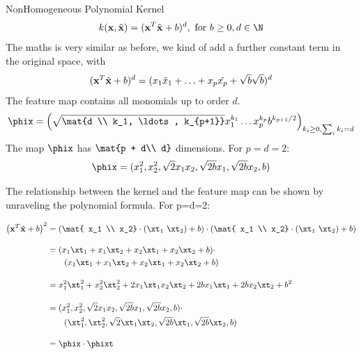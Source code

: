 \documentclass[11pt,compress,t,notes=noshow, xcolor=table]{beamer}
\begin{document}
\begin{vbframe}{NonHomogeneous Polynomial Kernel}
 $$k(\xv, \xtil) = (\xv^T \xtil + b)^d, \text{ for } b\geq 0, d \in \N$$
The maths is very similar as before, we kind of add a further constant term in the original space, with
$$ (\mathbf{x}^T \tilde{\mathbf{x}} + b)^d = (x_1 \tilde{x}_1 + \ldots + x_p \tilde{x_p} + \sqrt{b} \sqrt{b})^d$$
The feature map contains all monomials up to order $d$.
  $$\phix = \left( \sqrt{\mat{d \\ k_1, \ldots, k_{p+1}}} x_1^{k_1} \ldots x_p^{k_p} b^{k_{p+1}/2} \right)_{k_i \geq 0, \sum_i k_i = d}$$
The map $\phix$ has $\mat{p + d\\ d}$ dimensions. For $p=d=2$: 
$$\phix = (x_1^2, x_2^2, \sqrt{2} x_1 x_2, \sqrt{2b} x_1, \sqrt{2b} x_2, b)$$

\framebreak
  The relationship between the kernel and the feature map can be shown by unraveling the polynomial formula. For p=d=2:
  
  \begin{equation*}
    \begin{aligned}
        \left ( \xv^T \xtil + b  \right)^2 &=       \left ( \mat{ x_1 \\ x_2} \cdot (\xt_1 \ \xt_2) + b  \right) \cdot      \left ( \mat{ x_1 \\ x_2} \cdot (\xt_1 \ \xt_2) + b  \right) \\[10pt]
        &= (x_1 \xt_1 + x_1 \xt_2 + x_2 \xt_1 + x_2 \xt_2 + b) \cdot \\
         & \ \ \ \ \ \ (x_1 \xt_1 + x_1 \xt_2 + x_2 \xt_1 + x_2 \xt_2 + b) \\[10pt]
        &= x_1^2 \xt_1^2 + x_2^2 \xt_2^2  +  2  x_1 \xt_1 x_2 \xt_2  + 2 b x_1 \xt_1 + 2 b x_2 \xt_2  + b^2 \\[10pt]
        &= ( x_1^2 , x_2^2 , \sqrt{2} x_1 x_2 , \sqrt{2b} x_1 , \sqrt{2b} x_2 , b ) \cdot \\
        & \ \ \ \ \ \  ( \xt_1^2 , \xt_2^2 ,\sqrt{2} \xt_1 \xt_2 , \sqrt{2b} \xt_1 , \sqrt{2b} \xt_2 ,  b ) \\[10pt]
        &= \phix \cdot \phixt
    \end{aligned}
  \end{equation*}
\end{vbframe}
\end{document}
